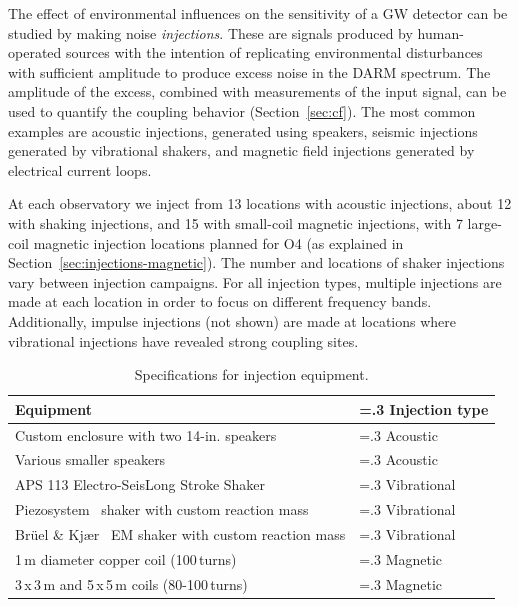 The effect of environmental influences on the sensitivity of a \ac{GW} detector can be studied by making noise \textit{injections}.
These are signals produced by human-operated sources with the intention of replicating environmental disturbances with sufficient amplitude to produce excess noise in the \ac{DARM} spectrum.
The amplitude of the excess, combined with measurements of the input signal, can be used to quantify the coupling behavior (Section~\ref{sec:cf}).
The most common examples are acoustic injections, generated using speakers, seismic injections generated by vibrational shakers, and magnetic field injections generated by electrical current loops.

At each observatory we inject from 13 locations with acoustic injections, about 12 with shaking injections, and 15 with small-coil magnetic injections, with 7 large-coil magnetic injection locations planned for \ac{O4} (as explained in Section~\ref{sec:injections-magnetic}).
The number and locations of shaker injections vary between injection campaigns. For all injection types, multiple injections are made at each location in order to focus on different frequency bands.
Additionally, impulse injections (not shown) are made at locations where vibrational injections have revealed strong coupling sites.

\begin{table}[h!]
	\centering%
	\caption{\label{tab:injectors}Specifications for injection equipment.}
	\begin{tabularx}{\linewidth}{X>{\hsize=.3\hsize}X}
		\toprule
		Equipment & Injection type \\
		\midrule
		Custom enclosure with two 14-in. speakers & Acoustic\\
		Various smaller speakers & Acoustic\\
		APS 113 Electro-Seis\reg Long Stroke Shaker~\citep{big_shaker} & Vibrational\\
		Piezosystem\reg~\citep{piezo} shaker with custom reaction mass & Vibrational\\
		Br\"uel \& Kj\ae r\reg~\citep{bk} EM shaker with custom reaction mass & Vibrational\\
		1\,m diameter copper coil (100\,turns) & Magnetic\\
		3\,x\,3\,m and 5\,x\,5\,m coils (80-100\,turns) & Magnetic\\
		\bottomrule
	\end{tabularx}
\end{table}


